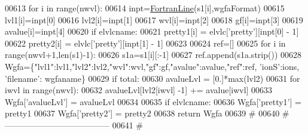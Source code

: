\begin{DoxyCode}
00613     \textcolor{keywordflow}{for} i \textcolor{keywordflow}{in} range(nwvl):
00614         inpt=\hyperlink{classpyneb_1_1utils_1_1_fortran_format_1_1_fortran_line}{FortranLine}(s1[i],wgfaFormat)
00615         lvl1[i]=inpt[0]
00616         lvl2[i]=inpt[1]
00617         wvl[i]=inpt[2]
00618         gf[i]=inpt[3]
00619         avalue[i]=inpt[4]
00620         \textcolor{keywordflow}{if} elvlcname:
00621             pretty1[i] = elvlc[\textcolor{stringliteral}{'pretty'}][inpt[0] - 1]
00622             pretty2[i] = elvlc[\textcolor{stringliteral}{'pretty'}][inpt[1] - 1]
00623 
00624     ref=[]
00625     \textcolor{keywordflow}{for} i \textcolor{keywordflow}{in} range(nwvl+1,len(s1)-1):
00626         s1a=s1[i][:-1]
00627         ref.append(s1a.strip())
00628     Wgfa=\{\textcolor{stringliteral}{"lvl1"}:lvl1,\textcolor{stringliteral}{"lvl2"}:lvl2,\textcolor{stringliteral}{"wvl"}:wvl,\textcolor{stringliteral}{"gf"}:gf,\textcolor{stringliteral}{"avalue"}:avalue,\textcolor{stringliteral}{"ref"}:ref, \textcolor{stringliteral}{'ionS'}:ions, \textcolor{stringliteral}{'filename'}:
      wgfaname\}
00629     \textcolor{keywordflow}{if} total:
00630         avalueLvl = [0.]*max(lvl2)
00631         \textcolor{keywordflow}{for} iwvl \textcolor{keywordflow}{in} range(nwvl):
00632             avalueLvl[lvl2[iwvl] -1] += avalue[iwvl]
00633         Wgfa[\textcolor{stringliteral}{'avalueLvl'}] = avalueLvl
00634 
00635     \textcolor{keywordflow}{if} elvlcname:
00636         Wgfa[\textcolor{stringliteral}{'pretty1'}] = pretty1
00637         Wgfa[\textcolor{stringliteral}{'pretty2'}] = pretty2
00638     \textcolor{keywordflow}{return} Wgfa
00639     \textcolor{comment}{#}
00640     \textcolor{comment}{# --------------------------------------}
00641     \textcolor{comment}{#}
\end{DoxyCode}
\hypertarget{namespacepyneb_1_1utils_1_1__chianti__tools_a300c13ee6815450bc20d25a2c6dcb8a8}{}
